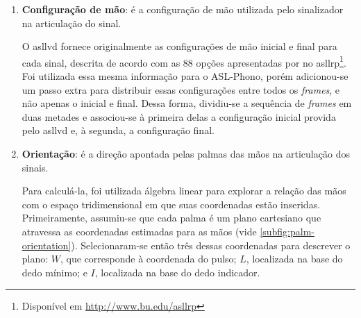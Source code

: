 \begin{enumerate}
    \item \textbf{Configuração de mão}: é a configuração de mão utilizada pelo sinalizador na articulação do sinal.

          O \acrshort{asllvd} fornece originalmente as configurações de mão inicial e final para cada sinal, descrita de acordo com as 88 opções apresentadas por  no \acrfull{asllrp}\footnote{
              Disponível em \url{http://www.bu.edu/asllrp}
          }.
          Foi utilizada essa mesma informação para o ASL-Phono, porém adicionou-se um passo extra para distribuir essas configurações entre todos os \textit{frames}, e não apenas o inicial e final.
          Dessa forma, dividiu-se a sequência de \textit{frames} em duas metades e associou-se à primeira delas a configuração inicial provida pelo \acrshort{asllvd} e, à segunda, a configuração final.

    \item \textbf{Orientação}: é a direção apontada pelas palmas das mãos na articulação dos sinais.

          Para calculá-la, foi utilizada álgebra linear para explorar a relação das mãos com o espaço tridimensional em que suas coordenadas estão inseridas.
          Primeiramente, assumiu-se que cada palma é um plano cartesiano que atravessa as coordenadas estimadas para as mãos (vide \autoref{subfig:palm-orientation}). Selecionaram-se então três dessas coordenadas para descrever o plano: \(W\), que corresponde à coordenada do pulso; \(L\), localizada na base do dedo mínimo; e \(I\), localizada na base do dedo indicador.


\end{enumerate}
